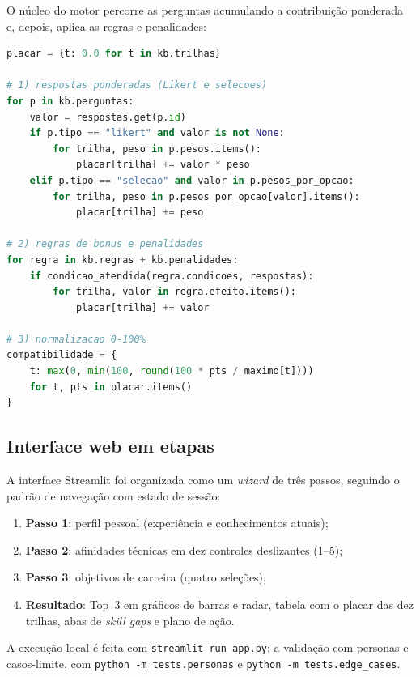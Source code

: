 \documentclass[12pt,a4paper]{article}
\begin{document}
O n\'ucleo do motor percorre as perguntas acumulando a contribui\c{c}\~ao ponderada
e, depois, aplica as regras e penalidades:

\noindent\begin{minipage}{\linewidth}
\begin{lstlisting}[language=Python, caption={N\'ucleo do c\'alculo de pontua\c{c}\~ao.}]
placar = {t: 0.0 for t in kb.trilhas}

# 1) respostas ponderadas (Likert e selecoes)
for p in kb.perguntas:
    valor = respostas.get(p.id)
    if p.tipo == "likert" and valor is not None:
        for trilha, peso in p.pesos.items():
            placar[trilha] += valor * peso
    elif p.tipo == "selecao" and valor in p.pesos_por_opcao:
        for trilha, peso in p.pesos_por_opcao[valor].items():
            placar[trilha] += peso

# 2) regras de bonus e penalidades
for regra in kb.regras + kb.penalidades:
    if condicao_atendida(regra.condicoes, respostas):
        for trilha, valor in regra.efeito.items():
            placar[trilha] += valor

# 3) normalizacao 0-100%
compatibilidade = {
    t: max(0, min(100, round(100 * pts / maximo[t])))
    for t, pts in placar.items()
}
\end{lstlisting}
\end{minipage}

\subsection{Interface web em etapas}

A interface Streamlit foi organizada como um \textit{wizard} de tr\^es passos,
seguindo o padr\~ao de navega\c{c}\~ao com estado de sess\~ao:

\begin{enumerate}
    \item \textbf{Passo 1}: perfil pessoal (experi\^encia e conhecimentos atuais);
    \item \textbf{Passo 2}: afinidades t\'ecnicas em dez controles deslizantes (1--5);
    \item \textbf{Passo 3}: objetivos de carreira (quatro sele\c{c}\~oes);
    \item \textbf{Resultado}: Top~3 em gr\'aficos de barras e radar, tabela com o
          placar das dez trilhas, abas de \textit{skill gaps} e plano de a\c{c}\~ao.
\end{enumerate}

A execu\c{c}\~ao local \'e feita com \texttt{streamlit run app.py}; a valida\c{c}\~ao
com personas e casos-limite, com \texttt{python -m tests.personas} e
\texttt{python -m tests.edge\_cases}.
\end{document}
